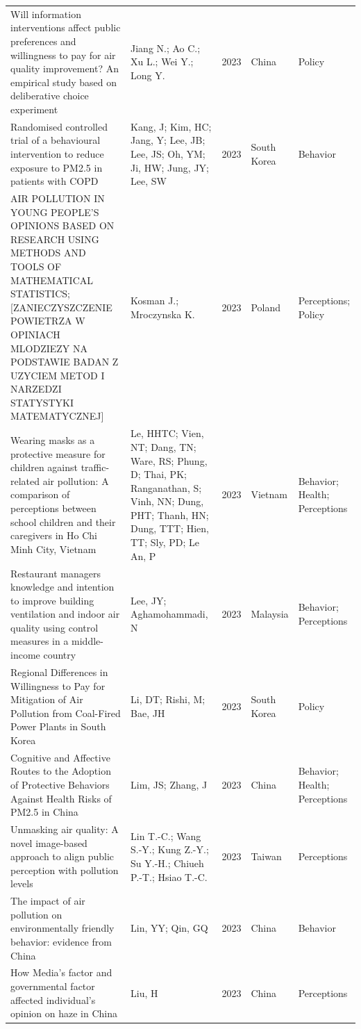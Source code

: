 {\begin{longtable}[t]{p{6cm}p{3cm}lp{3cm}p{3cm}}
Will information interventions affect public preferences and willingness to pay for air quality improvement? An empirical study based on deliberative choice experiment & Jiang N.; Ao C.; Xu L.; Wei Y.; Long Y. & 2023 & China & Policy\\
Randomised controlled trial of a behavioural intervention to reduce exposure to PM2.5 in patients with COPD & Kang, J; Kim, HC; Jang, Y; Lee, JB; Lee, JS; Oh, YM; Ji, HW; Jung, JY; Lee, SW & 2023 & South Korea & Behavior\\
AIR POLLUTION IN YOUNG PEOPLE'S OPINIONS BASED ON RESEARCH USING METHODS AND TOOLS OF MATHEMATICAL STATISTICS; [ZANIECZYSZCZENIE POWIETRZA W OPINIACH MLODZIEZY NA PODSTAWIE BADAN Z UZYCIEM METOD I NARZEDZI STATYSTYKI MATEMATYCZNEJ] & Kosman J.; Mroczynska K. & 2023 & Poland & Perceptions; Policy\\
\addlinespace
Wearing masks as a protective measure for children against traffic-related air pollution: A comparison of perceptions between school children and their caregivers in Ho Chi Minh City, Vietnam & Le, HHTC; Vien, NT; Dang, TN; Ware, RS; Phung, D; Thai, PK; Ranganathan, S; Vinh, NN; Dung, PHT; Thanh, HN; Dung, TTT; Hien, TT; Sly, PD; Le An, P & 2023 & Vietnam & Behavior; Health; Perceptions\\
Restaurant managers knowledge and intention to improve building ventilation and indoor air quality using control measures in a middle-income country & Lee, JY; Aghamohammadi, N & 2023 & Malaysia & Behavior; Perceptions\\
Regional Differences in Willingness to Pay for Mitigation of Air Pollution from Coal-Fired Power Plants in South Korea & Li, DT; Rishi, M; Bae, JH & 2023 & South Korea & Policy\\
Cognitive and Affective Routes to the Adoption of Protective Behaviors Against Health Risks of PM2.5 in China & Lim, JS; Zhang, J & 2023 & China & Behavior; Health; Perceptions\\
Unmasking air quality: A novel image-based approach to align public perception with pollution levels & Lin T.-C.; Wang S.-Y.; Kung Z.-Y.; Su Y.-H.; Chiueh P.-T.; Hsiao T.-C. & 2023 & Taiwan & Perceptions\\
\addlinespace
The impact of air pollution on environmentally friendly behavior: evidence from China & Lin, YY; Qin, GQ & 2023 & China & Behavior\\
How Media's factor and governmental factor affected individual's opinion on haze in China & Liu, H & 2023 & China & Perceptions\\

\end{longtable}}
